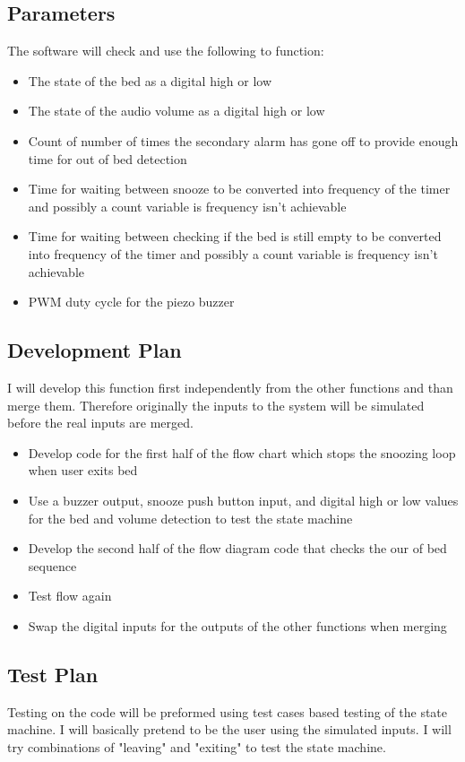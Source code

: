 \documentclass[11pt]{article}
\begin{document}
\subsection*{Parameters}
The software will check and use the following to function:
\begin{itemize}
	\item The state of the bed as a digital high or low
	\item The state of the audio volume as a digital high or low 
	\item Count of number of times the secondary alarm has gone off to provide enough time for out of bed detection
	\item Time for waiting between snooze to be converted into frequency of the timer and possibly a count variable is frequency isn't achievable
	\item Time for waiting between checking if the bed is still empty to be converted into frequency of the timer and possibly a count variable is frequency isn't achievable
	\item PWM duty cycle for the piezo buzzer
\end{itemize}

\subsection*{Development Plan}
I will develop this function first independently from the other functions and than merge them. 
Therefore originally the inputs to the system will be simulated before the real inputs are merged.

\begin{itemize}
	\item Develop code for the first half of the flow chart which stops the snoozing loop when user exits bed
	\item Use a buzzer output, snooze push button input, and digital high or low values for the bed and volume detection to test the state machine
	\item Develop the second half of the flow diagram code that checks the our of bed sequence
	\item Test flow again 
	\item Swap the digital inputs for the outputs of the other functions when merging 
\end{itemize}

\subsection*{Test Plan}
Testing on the code will be preformed using test cases based testing of the state machine. 
I will basically pretend to be the user using the simulated inputs.
I will try combinations of "leaving" and "exiting" to test the state machine. 
\end{document}
